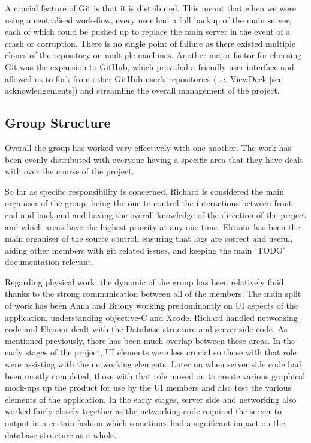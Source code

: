 \documentclass[a4wide, 10pt]{article}
\begin{document}
A crucial feature of Git is that it is distributed. This meant that when we were using a centralised work-flow, every user had a full backup of the main server, each of which could be pushed up to replace the main server in the event of a crash or corruption. There is no single point of failure as there existed multiple clones of the repository on multiple machines. Another major factor for choosing Git was the expansion to GitHub, which provided a friendly user-interface and allowed us to fork from other GitHub user's repositories (i.e. ViewDeck [see acknowledgements]) and streamline the overall management of the project.

\subsection{Group Structure}

Overall the group has worked very effectively with one another. The work has been evenly distributed with everyone having a specific area that they have dealt with over the course of the project. 

So far as specific responsibility is concerned, Richard is considered the main organiser of the group, being the one to control the interactions between front-end and back-end and having the overall knowledge of the direction of the project and which areas have the highest priority at any one time. Eleanor has been the main organiser of the source control, ensuring that logs are correct and useful, aiding other members with git related issues, and keeping the main 'TODO' documentation relevant.

Regarding physical work, the dynamic of the group has been relatively fluid thanks to the strong communication between all of the members. The main split of work has been Anna and Briony working predominantly on UI aspects of the application, understanding objective-C and Xcode. Richard handled networking code and Eleanor dealt with the Database structure and server side code. As mentioned previously, there has been much overlap between these areas. In the early stages of the project, UI elements were less crucial so those with that role were assisting with the networking elements. Later on when server side code had been mostly completed, those with that role moved on to create various graphical mock-ups up the product for use by the UI members and also test the various elements of the application. In the early stages, server side and networking also worked fairly closely together as the networking code required the server to output in a certain fashion which sometimes had a significant impact on the database structure as a whole. 
\end{document}
